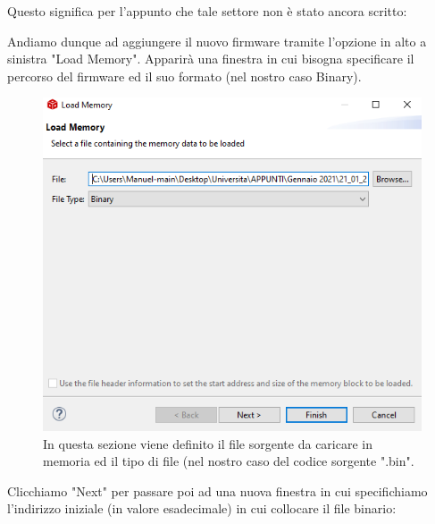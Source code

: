 \documentclass[LaM,binding=0.6cm]{../sapthesis}
\begin{document}
Questo significa per l'appunto che tale settore non è stato ancora scritto:
\clearpage

Andiamo dunque ad aggiungere il nuovo firmware tramite l'opzione in alto a sinistra "Load Memory".
Apparirà una finestra in cui bisogna specificare il percorso del firmware ed il suo formato (nel nostro caso Binary).

\begin{figure}[htbp]
\centerline{\includegraphics[scale=0.75]{examples/LoadMemory1.PNG}}
\caption{In questa sezione viene definito il file sorgente da caricare in memoria ed il tipo di file (nel nostro caso del codice sorgente ".bin".}
\label{fig}
\end{figure}
\newline

\clearpage
Clicchiamo "Next" per passare poi ad una nuova finestra in cui specifichiamo l'indirizzo  iniziale (in valore esadecimale) in cui collocare il file binario:
\end{document}
